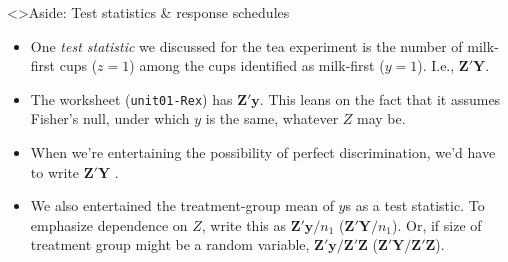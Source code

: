 \begin{frame}<\nottheirhandout>{Aside: Test statistics \& response schedules}
  
\begin{itemize}
\item One \textit{test statistic} we discussed for the tea experiment
  is the number of milk-first cups ($z=1$) among the cups identified as
  milk-first ($y=1$). I.e., $\mathbf{Z}'\mathbf{Y}$. \pause


\item The worksheet (\texttt{unit01-Rex}) has $\mathbf{Z}'\mathbf{y}$.  This leans on the fact that it assumes Fisher's null, under which $y$ is the same, whatever $Z$ may be. \pause

\item When we're entertaining the possibility of perfect discrimination, we'd have to write $\mathbf{Z}'\mathbf{Y}$ .
\item We also entertained the treatment-group mean of $y$s as a test
  statistic. To emphasize dependence on $Z$, write this as $\mathbf{Z}'\mathbf{y}/n_{1}$
  ($\mathbf{Z}'\mathbf{Y}/n_{1}$). Or, if size of treatment group might be a random
  variable, $\mathbf{Z}'\mathbf{y}/\mathbf{Z}'\mathbf{Z}$  ($\mathbf{Z}'\mathbf{Y}/\mathbf{Z}'\mathbf{Z}$).
\end{itemize}
\end{frame}

